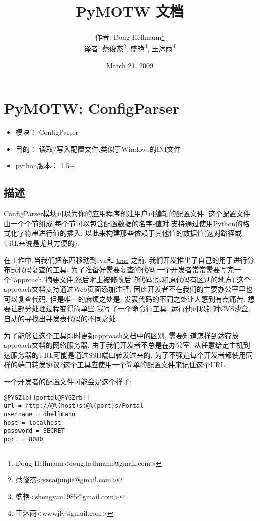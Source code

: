 \documentclass[a4paper,10pt,english]{manual}
\title{PyMOTW 文档}
\date{March 21, 2009}
\author{作者: Doug Hellmann\footnote{Doug Hellmann<doug.hellmann@gmail.com>} \\译者:  蔡俊杰\footnote{蔡俊杰<yzcaijunjie@gmail.com>}, 盛艳\footnote{盛艳<shengyan1985@gmail.com>}, 王沐雨\footnote{王沐雨<wwwjfy@gmail.com>}}
\begin{document}

\maketitle
\tableofcontents
\resetcurrentobjects

\chapter{PyMOTW: ConfigParser}
\begin{itemize}
\item {} 
模块： ConfigParser

\item {} 
目的： 读取/写入配置文件,类似于Windows的INI文件

\item {} 
python版本： 1.5+

\end{itemize}


\section{描述}

ConfigParser模块可以为你的应用程序创建用户可编辑的配置文件. 这个配置文件由一个个节组成,每个节可以包含配置数据的名字-值对.支持通过使用Python的格式化字符串进行值的插入, 以此来构建那些依赖于其他值的数据值(这对路径或URL来说是尤其方便的).

在工作中,当我们把东西移动到svn和 \href{http://trac.edgewall.org/}{trac} 之前, 我们开发推出了自己的用于进行分布式代码复查的工具. 为了准备好需要复查的代码,一个开发者常常需要写完一个''approach''摘要文件,然后附上被修改后的代码(即和原代码有区别的地方).这个 approach文档支持通过Web页面添加注释, 因此开发者不在我们的主要办公室里也可以复查代码. 但是唯一的麻烦之处是, 发表代码的不同之处让人感到有点痛苦. 想要让部分处理过程变得简单些,我写了一个命令行工具, 运行他可以针对CVS沙盒,自动的寻找出并发表代码的不同之处.

为了能够让这个工具即时更新approach文档中的区别, 需要知道怎样到达存放approach文档的网络服务器. 由于我们开发者不总是在办公室, 从任意给定主机到达服务器的URL可能是通过SSH端口转发过来的. 为了不强迫每个开发者都使用同样的端口转发协议?这个工具应使用一个简单的配置文件来记住这个URL.

一个开发者的配置文件可能会是这个样子:

\begin{Verbatim}[commandchars=@\[\]]
@PYGZlb[]portal@PYGZrb[]
url = http://@%(host)s:@%(port)s/Portal
username = dhellmann
host = localhost
password = SECRET
port = 8080
\end{Verbatim}
\end{document}
